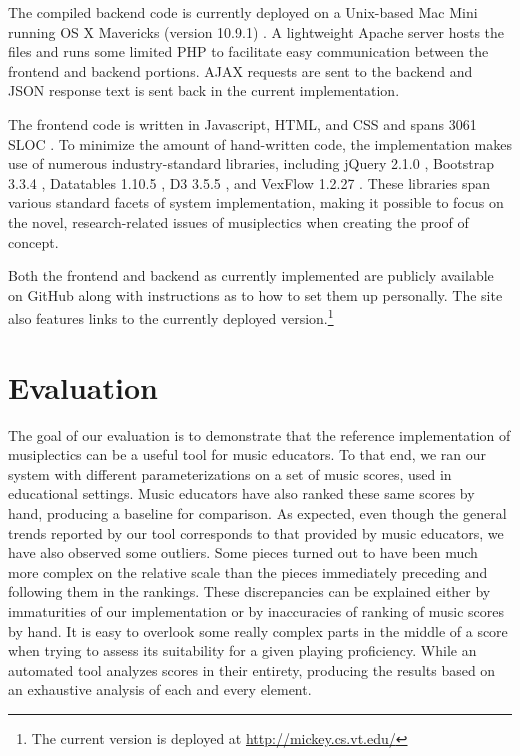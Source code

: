 \documentclass[12pt]{report}
\begin{document}
The compiled backend code is currently deployed on a Unix-based Mac Mini \cite{macmini} running OS X Mavericks (version 10.9.1) \cite{osx}. A lightweight Apache server \cite{apacheServ} hosts the files and runs some limited PHP to facilitate easy communication between the frontend and backend portions. AJAX requests \cite{garrett2005ajax} are sent to the backend and JSON response text is sent back in the current implementation.

The frontend code is written in Javascript, HTML, and CSS and spans 3061 SLOC \cite{nguyen2007sloc}. To minimize the amount of hand-written code, the implementation makes use of numerous industry-standard libraries, including jQuery 2.1.0 \cite{jQuery}, Bootstrap 3.3.4 \cite{Bootstrap}, Datatables 1.10.5 \cite{DataTables}, D3 3.5.5 \cite{D3}, and VexFlow 1.2.27 \cite{VexFlow}. These libraries span various standard facets of system implementation, making it possible to focus on the novel, research-related issues of musiplectics when creating the proof of concept.

Both the frontend and backend as currently implemented are publicly available on GitHub \cite{GithubMusicScoring} along with instructions as to how to set them up personally. The site also features links to the currently deployed version.\footnote{The current version is deployed at \url{http://mickey.cs.vt.edu/}}

\chapter{Evaluation} 
\label{sec:eval}

The goal of our evaluation is to demonstrate that the reference implementation of musiplectics can be a useful tool for music educators. To that end, we ran our system with different parameterizations on a set of music scores, used in educational settings. Music educators have also ranked these same scores by hand, producing a baseline for comparison. As expected, even though the general trends reported by our tool corresponds to that provided by music educators, we have also observed some outliers. Some pieces turned out to have been much more complex on the relative scale than the pieces immediately preceding and following them in the rankings. These discrepancies can be explained either by immaturities of our implementation or by inaccuracies of ranking of music scores by hand. It is easy to overlook some really complex parts in the middle of a score when trying to assess its suitability for a given playing proficiency. While an automated tool analyzes scores in their entirety, producing the results based on an exhaustive analysis of each and every element.
\end{document}
